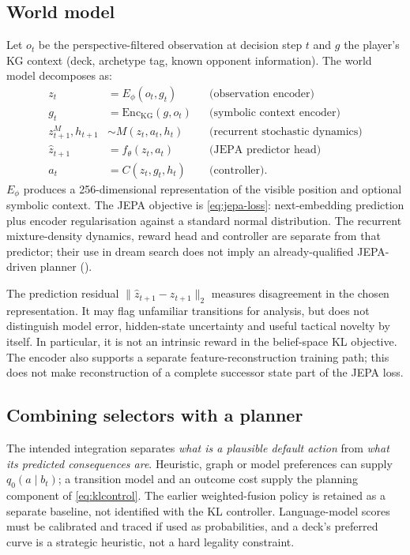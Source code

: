 \documentclass[11pt,a4paper]{article}
\theoremstyle{definition}
\theoremstyle{plain}
\begin{document}
\subsection{World model}
\label{sec:wm}
Let $o_t$ be the perspective-filtered observation at decision step $t$ and $g$ the player's KG context (deck, archetype tag, known opponent information). The world model decomposes as:
\begin{align}
z_t       &= E_\phi(o_t,g_t)            && \text{(observation encoder)} \\
g_t       &= \mathrm{Enc}_{\mathrm{KG}}(g,o_t) && \text{(symbolic context encoder)} \\
z_{t+1}^{M},h_{t+1} &\sim M(z_t,a_t,h_t) && \text{(recurrent stochastic dynamics)} \\
\hat z_{t+1} &= f_\theta(z_t,a_t)    && \text{(JEPA predictor head)} \\
a_t       &= C(z_t, g_t, h_t)            && \text{(controller).}
\end{align}
$E_\phi$ produces a 256-dimensional representation of the visible position and optional symbolic context. The JEPA objective is \eqref{eq:jepa-loss}: next-embedding prediction plus encoder regularisation against a standard normal distribution. The recurrent mixture-density dynamics, reward head and controller are separate from that predictor; their use in dream search does not imply an already-qualified JEPA-driven planner ().

The prediction residual $\|\hat z_{t+1}-z_{t+1}\|_2$ measures disagreement in the chosen representation. It may flag unfamiliar transitions for analysis, but does not distinguish model error, hidden-state uncertainty and useful tactical novelty by itself. In particular, it is not an intrinsic reward in the belief-space KL objective. The encoder also supports a separate feature-reconstruction training path; this does not make reconstruction of a complete successor state part of the JEPA loss.

\subsection{Combining selectors with a planner}
The intended integration separates \emph{what is a plausible default action} from \emph{what its predicted consequences are}. Heuristic, graph or model preferences can supply $q_0(a\mid b_t)$; a transition model and an outcome cost supply the planning component of \eqref{eq:klcontrol}. The earlier weighted-fusion policy is retained as a separate baseline, not identified with the KL controller. Language-model scores must be calibrated and traced if used as probabilities, and a deck's preferred curve is a strategic heuristic, not a hard legality constraint.
\end{document}
